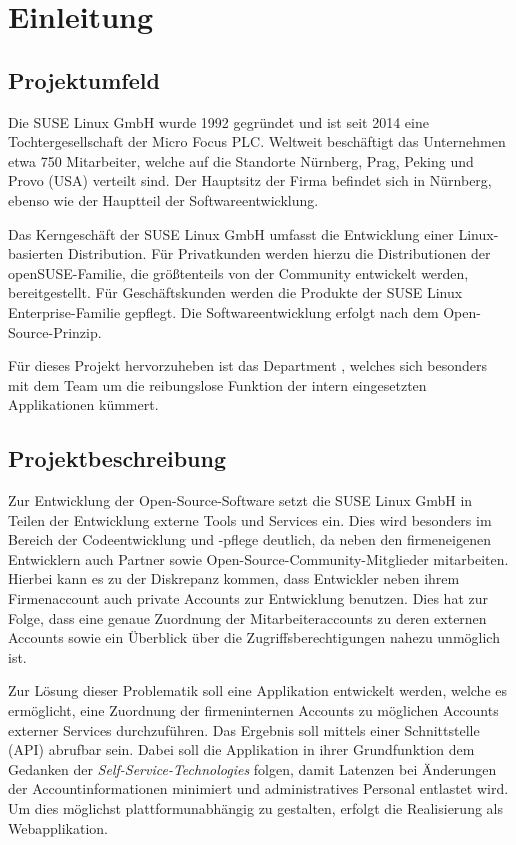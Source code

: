\section{Einleitung}
\label{sec:Einleitung}

\subsection{Projektumfeld}
\label{sec:Projektumfeld}
Die SUSE Linux GmbH wurde 1992 gegründet und ist seit 2014 eine Tochtergesellschaft der Micro Focus
PLC. Weltweit beschäftigt das Unternehmen etwa 750 Mitarbeiter, welche auf die Standorte Nürnberg,
Prag, Peking und Provo (USA) verteilt sind. Der Hauptsitz der Firma befindet sich in Nürnberg,
ebenso wie der Hauptteil der Softwareentwicklung.

Das Kerngeschäft der SUSE Linux GmbH umfasst die Entwicklung einer Linux-basierten Distribution.
Für Privatkunden werden hierzu die Distributionen der openSUSE-Familie, die größtenteils von der
Community entwickelt werden, bereitgestellt. Für Geschäftskunden werden die Produkte der SUSE Linux
Enterprise-Familie gepflegt. Die Softwareentwicklung erfolgt nach dem Open-Source-Prinzip.

Für dieses Projekt hervorzuheben ist das Department , welches sich besonders mit dem  Team um die
reibungslose Funktion der intern eingesetzten Applikationen kümmert.

\subsection{Projektbeschreibung}
\label{sec:Projektbeschreibung}
Zur Entwicklung der Open-Source-Software setzt die SUSE Linux GmbH in Teilen der Entwicklung
externe Tools und Services ein. Dies wird besonders im Bereich der Codeentwicklung und -pflege
deutlich, da neben den firmeneigenen Entwicklern auch Partner sowie Open-Source-Community-Mitglieder
mitarbeiten. Hierbei kann es zu der Diskrepanz kommen, dass Entwickler neben ihrem Firmenaccount
auch private Accounts zur Entwicklung benutzen. Dies hat zur Folge, dass eine genaue Zuordnung
der Mitarbeiteraccounts zu deren externen Accounts
sowie ein Überblick über die Zugriffsberechtigungen nahezu unmöglich ist.

Zur Lösung dieser Problematik soll eine Applikation entwickelt werden, welche es ermöglicht,
eine Zuordnung der firmeninternen Accounts zu möglichen Accounts externer Services durchzuführen.
Das Ergebnis soll mittels einer Schnittstelle (\acs{API}) abrufbar sein.
Dabei soll die Applikation in ihrer Grundfunktion dem Gedanken der \textit{Self-Service-Technologies} folgen,
damit Latenzen bei Änderungen der Accountinformationen minimiert und administratives Personal
entlastet wird. Um dies möglichst plattformunabhängig zu gestalten, erfolgt die Realisierung als
Webapplikation.

